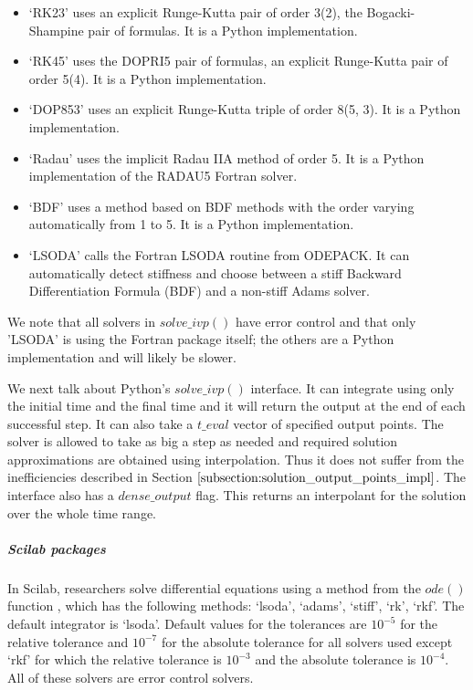 \begin{itemize}
\item `RK23' uses an explicit Runge-Kutta pair of order 3(2), the Bogacki-Shampine pair of formulas. It is a Python implementation.

\item `RK45' uses the DOPRI5 pair of formulas, an explicit Runge-Kutta pair of order 5(4). It is a Python implementation.

\item `DOP853' uses an explicit Runge-Kutta triple of order 8(5, 3). It is a Python implementation.

\item `Radau' uses the implicit Radau IIA method of order 5. It is a Python implementation of the RADAU5 Fortran solver.

\item `BDF' uses a method based on BDF methods with the order varying automatically from 1 to 5. It is a Python implementation.

\item `LSODA' calls the Fortran LSODA routine from ODEPACK. It can automatically detect stiffness and choose between a stiff Backward Differentiation Formula (BDF) and a non-stiff Adams solver.
\end{itemize}

We note that all solvers in $solve\_ivp()$ have error control and that only 'LSODA' is using the Fortran package itself; the others are a Python implementation and will likely be slower.

We next talk about Python's $solve\_ivp()$ interface. It can integrate using only the initial time and the final time and it will return the output at the end of each successful step. It can also take a $t\_eval$ vector of specified output points. The solver is allowed to take as big a step as needed and required solution approximations are obtained using interpolation. Thus it does not suffer from the inefficiencies described in Section $\ref{subsection:solution_output_points_impl}$. The interface also has a $dense\_output$ flag. This returns an interpolant for the solution over the whole time range.

\subparagraph{Scilab packages}
In Scilab, researchers solve differential equations using a method from the $ode()$ function \cite{campbell2010modeling}, which has the following methods: `lsoda', `adams', `stiff', `rk', `rkf'. The default integrator is `lsoda'.
Default values for the tolerances are $10^{-5}$ for the relative tolerance and $10^{-7}$ for the absolute tolerance for all solvers used except `rkf' for which the relative tolerance is $10^{-3}$ and the absolute tolerance is $10^{-4}$. All of these solvers are error control solvers.

